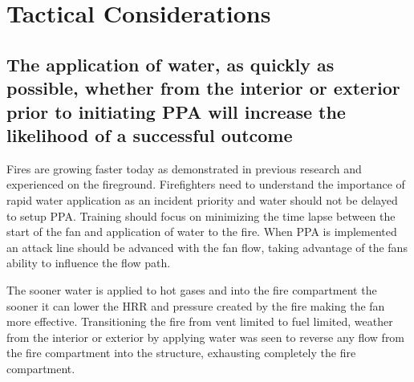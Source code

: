 \documentclass{article}
\begin{document}
\section{Tactical Considerations}

\subsection{The application of water, as quickly as possible, whether from the interior or exterior prior to initiating PPA will increase the likelihood of a successful outcome} \label{sec:EarlyApplication}
Fires are growing faster today as demonstrated in previous research and experienced on the fireground.  Firefighters need to understand the importance of rapid water application as an incident priority and water should not be delayed to setup PPA.  Training should focus on minimizing the time lapse between the start of the fan and application of water to the fire.  When PPA is implemented an attack line should be advanced with the fan flow, taking advantage of the fans ability to influence the flow path.

The sooner water is applied to hot gases and into the fire compartment the sooner it can lower the HRR and pressure created by the fire making the fan more effective.  Transitioning the fire from vent limited to fuel limited, weather from the interior or exterior by applying water was seen to reverse any flow from the fire compartment into the structure, exhausting completely the fire compartment.
\end{document}
